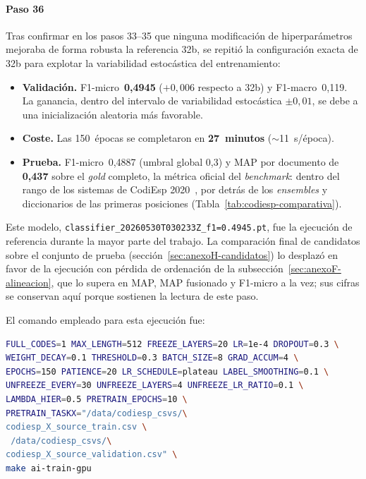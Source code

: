\paragraph{Paso 36}
\begin{sloppypar}
Tras confirmar en los pasos 33--35 que ninguna modificación de hiperparámetros mejoraba de forma robusta la referencia 32b, se repitió la configuración exacta de 32b para explotar la variabilidad estocástica del entrenamiento:

\begin{itemize}
 \item \textbf{Validación.} F1-micro~\textbf{0,4945} ($+0{,}006$ respecto a 32b) y F1-macro~0,119. La ganancia, dentro del intervalo de variabilidad estocástica $\pm 0{,}01$, se debe a una inicialización aleatoria más favorable.
 \item \textbf{Coste.} Las 150~épocas se completaron en \textbf{27~minutos} ($\sim$11~s/época).
 \item \textbf{Prueba.} F1-micro~0,4887 (umbral global 0,3) y MAP por documento de \textbf{0,437} sobre el \emph{gold} completo, la métrica oficial del \emph{benchmark}: dentro del rango de los sistemas de CodiEsp 2020~\cite{miranda2020}, por detrás de los \emph{ensembles} y diccionarios de las primeras posiciones (Tabla~\ref{tab:codiesp-comparativa}).
\end{itemize}

Este modelo, \texttt{classifier\_20260530T030233Z\_f1=0.4945.pt}, fue la ejecución de referencia durante la mayor parte del trabajo. La comparación final de candidatos sobre el conjunto de prueba (sección~\ref{sec:anexoH-candidatos}) lo desplazó en favor de la ejecución con pérdida de ordenación de la subsección~\ref{sec:anexoF-alineacion}, que lo supera en MAP, MAP fusionado y F1-micro a la vez; sus cifras se conservan aquí porque sostienen la lectura de este paso.

El comando empleado para esta ejecución fue:
\begin{lstlisting}[language=bash,basicstyle=\small\ttfamily,showstringspaces=false]
FULL_CODES=1 MAX_LENGTH=512 FREEZE_LAYERS=20 LR=1e-4 DROPOUT=0.3 \
WEIGHT_DECAY=0.1 THRESHOLD=0.3 BATCH_SIZE=8 GRAD_ACCUM=4 \
EPOCHS=150 PATIENCE=20 LR_SCHEDULE=plateau LABEL_SMOOTHING=0.1 \
UNFREEZE_EVERY=30 UNFREEZE_LAYERS=4 UNFREEZE_LR_RATIO=0.1 \
LAMBDA_HIER=0.5 PRETRAIN_EPOCHS=10 \
PRETRAIN_TASKX="/data/codiesp_csvs/\
codiesp_X_source_train.csv \
 /data/codiesp_csvs/\
codiesp_X_source_validation.csv" \
make ai-train-gpu
\end{lstlisting}
\end{sloppypar}

